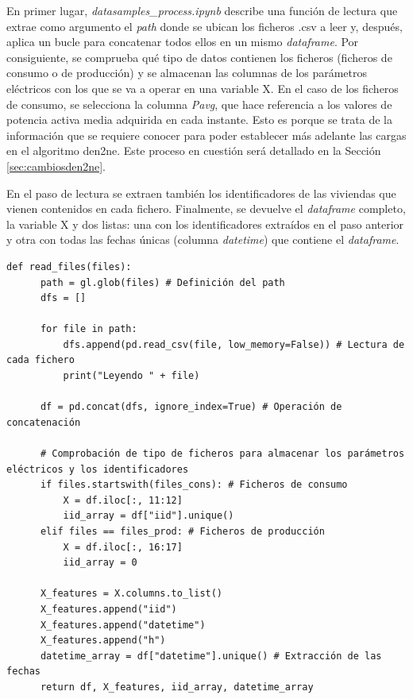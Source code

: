\vspace{3mm}

En primer lugar, \textit{datasamples\_process.ipynb} describe una función de lectura que extrae como argumento el \textit{path} donde se ubican los ficheros .csv a leer y, después, aplica un bucle para concatenar todos ellos en un mismo \textit{dataframe}. Por consiguiente, se comprueba qué tipo de datos contienen los ficheros (ficheros de consumo o de producción) y se almacenan las columnas de los parámetros eléctricos con los que se va a operar en una variable X. En el caso de los ficheros de consumo, se selecciona la columna \textit{Pavg}, que hace referencia a los valores de potencia activa media adquirida en cada instante. Esto es porque se trata de la información que se requiere conocer para poder establecer más adelante las cargas en el algoritmo \gls{den2ne}. Este proceso en cuestión será detallado en la Sección \ref{sec:cambiosden2ne}.

\vspace{3mm}

En el paso de lectura se extraen también los identificadores de las viviendas que vienen contenidos en cada fichero. Finalmente, se devuelve el \textit{dataframe} completo, la variable X y dos listas: una con los identificadores extraídos en el paso anterior y otra con todas las fechas únicas (columna \textit{datetime}) que contiene el \textit{dataframe}.

\vspace{3mm}

\begin{lstlisting}[style=Python, caption={Función de lectura de los ficheros}]
  def read_files(files):
      path = gl.glob(files) # Definición del path
      dfs = []

      for file in path:
          dfs.append(pd.read_csv(file, low_memory=False)) # Lectura de cada fichero
          print("Leyendo " + file)

      df = pd.concat(dfs, ignore_index=True) # Operación de concatenación

      # Comprobación de tipo de ficheros para almacenar los parámetros eléctricos y los identificadores
      if files.startswith(files_cons): # Ficheros de consumo
          X = df.iloc[:, 11:12]
          iid_array = df["iid"].unique()
      elif files == files_prod: # Ficheros de producción
          X = df.iloc[:, 16:17]
          iid_array = 0

      X_features = X.columns.to_list()
      X_features.append("iid")
      X_features.append("datetime")
      X_features.append("h")
      datetime_array = df["datetime"].unique() # Extracción de las fechas
      return df, X_features, iid_array, datetime_array
\end{lstlisting}


